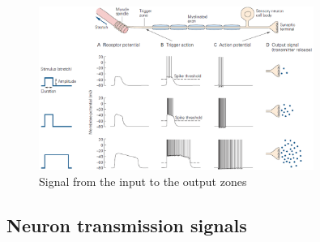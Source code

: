 \begin{descriptionlist}
    \begin{figure}[h]
        \centering
        \includegraphics[width=0.8\textwidth]{./img/neuron_transmission2.png}
        \caption{Signal from the input to the output zones}
    \end{figure}
\end{descriptionlist}


\subsection{Neuron transmission signals}

